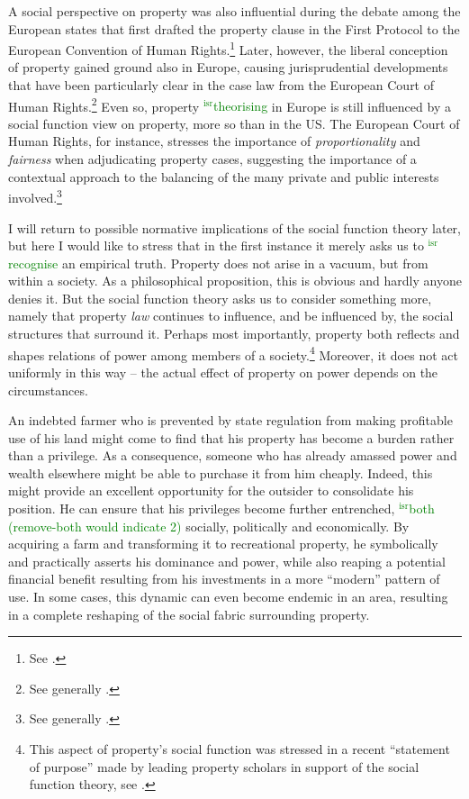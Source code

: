 \documentclass[12pt,a4paper]{book} %
\newcommand{\isr}[1]{\textcolor{green}{$^{\textrm{isr}}${#1}}}
\begin{document}
A social perspective on property was also influential during the debate among the European states that first drafted the property clause in the First Protocol to the European Convention of Human Rights.\footnote{See \cite[1063-1065]{allen10}.} Later, however, the liberal conception of property gained ground also in Europe, causing jurisprudential developments that have been particularly clear in the case law from the European Court of Human Rights.\footnote{See generally \cite{allen10}.} Even so, property \isr{theorising} in Europe is still influenced by a social function view on property, more so than in the US. The European Court of Human Rights, for instance, stresses the importance of {\it proportionality} and {\it fairness} when adjudicating property cases, suggesting the importance of a contextual approach to the balancing of the many private and public interests involved.\footnote{See generally \cite[Chapter 5]{allen05}.}

I will return to possible normative implications of the social function theory later, but here I would like to stress that in the first instance it merely asks us to \isr{recognise} an empirical truth. Property does not arise in a vacuum, but from within a society. As a philosophical proposition, this is obvious and hardly anyone denies it. But the social function theory asks us to consider something more, namely that property {\it law} continues to influence, and be influenced by, the social structures that surround it. Perhaps most importantly, property both reflects and shapes relations of power among members of a society.\footnote{This aspect of property's social function was stressed in a recent ``statement of purpose'' made by leading property scholars in support of the social function theory, see \cite{alexander09a}.} Moreover, it does not act uniformly in this way -- the actual effect of property on power depends on the circumstances.

An indebted farmer who is prevented by state regulation from making profitable use of his land might come to find that his property has become a burden rather than a privilege. As a consequence, someone who has already amassed power and wealth elsewhere might be able to purchase it from him cheaply. Indeed, this might provide an excellent opportunity for the outsider to consolidate his position. He can ensure that his privileges become further entrenched, \isr{both (remove-both would indicate 2)} socially, politically and economically. By acquiring a farm and transforming it to recreational property, he symbolically and practically asserts his dominance and power, while also reaping a potential financial benefit resulting from his investments in a more ``modern'' pattern of use. In some cases, this dynamic can even become endemic in an area, resulting in a complete reshaping of the social fabric surrounding property.
\end{document}
